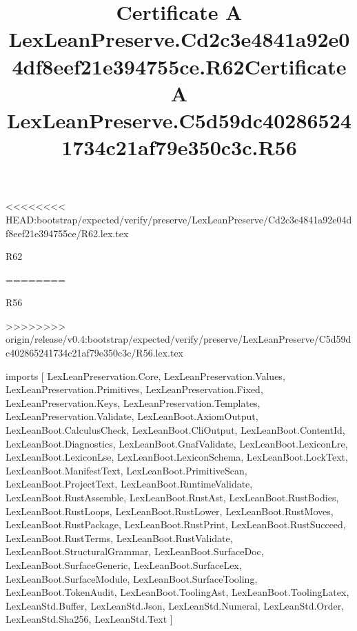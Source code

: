 <<<<<<<< HEAD:bootstrap/expected/verify/preserve/LexLeanPreserve/Cd2c3e4841a92e04df8eef21e394755ce/R62.lex.tex
\begin{lexlean}{R62}
\title{Certificate A LexLeanPreserve.Cd2c3e4841a92e04df8eef21e394755ce.R62}
========
\begin{lexlean}{R56}
\title{Certificate A LexLeanPreserve.C5d59dc402865241734c21af79e350c3c.R56}
>>>>>>>> origin/release/v0.4:bootstrap/expected/verify/preserve/LexLeanPreserve/C5d59dc402865241734c21af79e350c3c/R56.lex.tex
\begin{coremodule}
imports [
  LexLeanPreservation.Core,
  LexLeanPreservation.Values,
  LexLeanPreservation.Primitives,
  LexLeanPreservation.Fixed,
  LexLeanPreservation.Keys,
  LexLeanPreservation.Templates,
  LexLeanPreservation.Validate,
  LexLeanBoot.AxiomOutput,
  LexLeanBoot.CalculusCheck,
  LexLeanBoot.CliOutput,
  LexLeanBoot.ContentId,
  LexLeanBoot.Diagnostics,
  LexLeanBoot.GnafValidate,
  LexLeanBoot.LexiconLre,
  LexLeanBoot.LexiconLse,
  LexLeanBoot.LexiconSchema,
  LexLeanBoot.LockText,
  LexLeanBoot.ManifestText,
  LexLeanBoot.PrimitiveScan,
  LexLeanBoot.ProjectText,
  LexLeanBoot.RuntimeValidate,
  LexLeanBoot.RustAssemble,
  LexLeanBoot.RustAst,
  LexLeanBoot.RustBodies,
  LexLeanBoot.RustLoops,
  LexLeanBoot.RustLower,
  LexLeanBoot.RustMoves,
  LexLeanBoot.RustPackage,
  LexLeanBoot.RustPrint,
  LexLeanBoot.RustSucceed,
  LexLeanBoot.RustTerms,
  LexLeanBoot.RustValidate,
  LexLeanBoot.StructuralGrammar,
  LexLeanBoot.SurfaceDoc,
  LexLeanBoot.SurfaceGeneric,
  LexLeanBoot.SurfaceLex,
  LexLeanBoot.SurfaceModule,
  LexLeanBoot.SurfaceTooling,
  LexLeanBoot.TokenAudit,
  LexLeanBoot.ToolingAst,
  LexLeanBoot.ToolingLatex,
  LexLeanStd.Buffer,
  LexLeanStd.Json,
  LexLeanStd.Numeral,
  LexLeanStd.Order,
  LexLeanStd.Sha256,
  LexLeanStd.Text
]


\end{coremodule}
\end{lexlean}
\end{lexlean}
